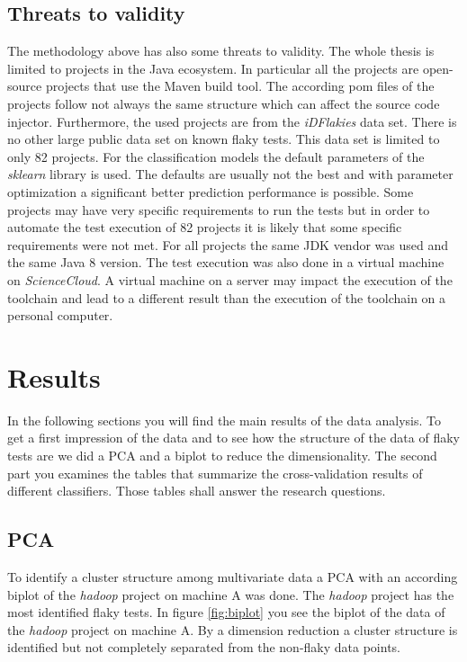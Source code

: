 \documentclass{seal_thesis}
\begin{document}
\section{Threats to validity}
The methodology above has also some threats to validity. The whole thesis is limited to projects in the Java ecosystem. In particular all the projects are open-source projects that use the Maven build tool. The according pom files of the projects follow not always the same structure which can affect the source code injector. Furthermore, the used projects are from the \textit{iDFlakies} data set. There is no other large public data set on known flaky tests. This data set is limited to only 82 projects. For the classification models the default parameters of the \textit{sklearn} library is used. The defaults are usually not the best and with parameter optimization a significant better prediction performance is possible. Some projects may have very specific requirements to run the tests but in order to automate the test execution of 82 projects it is likely that some specific requirements were not met. For all projects the same JDK vendor was used and the same Java 8 version. The test execution was also done in a virtual machine on \textit{ScienceCloud}. A virtual machine on a server may impact the execution of the toolchain and lead to a different result than the execution of the toolchain on a personal computer. 




\chapter{Results}
In the following sections you will find the main results of the data analysis. To get a first impression of the data and to see how the structure of the data of flaky tests are  we did a PCA and a biplot to reduce the dimensionality. The second part you examines the tables that summarize the cross-validation results of different classifiers. Those tables shall answer the research questions.
\section{PCA}
To identify a cluster structure among multivariate data a PCA with an according biplot of the \textit{hadoop} project on machine A was done. The \textit{hadoop} project has the most identified flaky tests. In figure \ref{fig:biplot} you see the biplot  of the data of the \textit{hadoop} project on machine A. By a dimension reduction a cluster structure is identified but not completely separated from the non-flaky data points. \\ 
\end{document}
